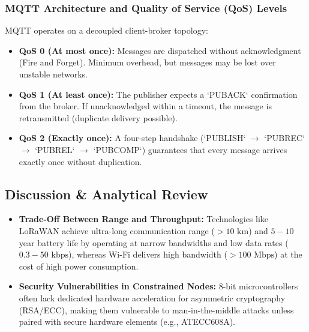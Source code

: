\documentclass[11pt,a4paper]{article}
\begin{document}
\subsubsection{MQTT Architecture and Quality of Service (QoS) Levels}
MQTT operates on a decoupled client-broker topology:
\begin{itemize}[noitemsep]
    \item \textbf{QoS 0 (At most once):} Messages are dispatched without acknowledgment (Fire and Forget). Minimum overhead, but messages may be lost over unstable networks.
    \item \textbf{QoS 1 (At least once):} The publisher expects a `PUBACK` confirmation from the broker. If unacknowledged within a timeout, the message is retransmitted (duplicate delivery possible).
    \item \textbf{QoS 2 (Exactly once):} A four-step handshake (`PUBLISH` $\rightarrow$ `PUBREC` $\rightarrow$ `PUBREL` $\rightarrow$ `PUBCOMP`) guarantees that every message arrives exactly once without duplication.
\end{itemize}

\subsection{Discussion \& Analytical Review}
\begin{itemize}[noitemsep]
    \item \textbf{Trade-Off Between Range and Throughput:} Technologies like LoRaWAN achieve ultra-long communication range ($>10\text{ km}$) and $5-10$ year battery life by operating at narrow bandwidths and low data rates ($0.3-50\text{ kbps}$), whereas Wi-Fi delivers high bandwidth ($>100\text{ Mbps}$) at the cost of high power consumption.
    \item \textbf{Security Vulnerabilities in Constrained Nodes:} 8-bit microcontrollers often lack dedicated hardware acceleration for asymmetric cryptography (RSA/ECC), making them vulnerable to man-in-the-middle attacks unless paired with secure hardware elements (e.g., ATECC608A).
\end{itemize}
\end{document}
